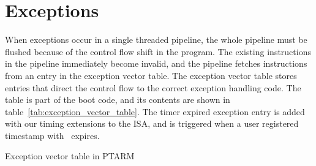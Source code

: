 \section{Exceptions}
\label{subsec:exception_handling_in_ptarm}
When exceptions occur in a single threaded pipeline, the whole pipeline must be flushed because of the control flow shift in the program. 
The existing instructions in the pipeline immediately become invalid, and the pipeline fetches instructions from an entry in the exception vector table. 
The exception vector table stores entries that direct the control flow to the correct exception handling code.  
The table is part of the boot code, and its contents are shown in table~\ref{tab:exception_vector_table}.
The timer expired exception entry is added with our timing extensions to the ISA, and is triggered when a user registered timestamp with \exceptiononexpire\ expires.  
\begin{table}[h]
\noindent{}
\vspace{1mm}
\caption{Exception vector table in PTARM}
\label{tab:exception_vector_table}
\end{table}

